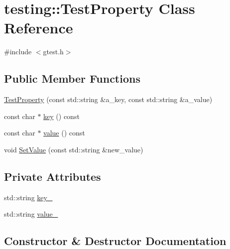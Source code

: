 \hypertarget{classtesting_1_1TestProperty}{}\section{testing\+:\+:Test\+Property Class Reference}
\label{classtesting_1_1TestProperty}


{\ttfamily \#include $<$gtest.\+h$>$}

\subsection*{Public Member Functions}
\begin{DoxyCompactItemize}
\item 
\hyperlink{classtesting_1_1TestProperty_a25a0ccf1c75a92af46a48d3c2a873e6d}{Test\+Property} (const std\+::string \&a\+\_\+key, const std\+::string \&a\+\_\+value)
\item 
const char $\ast$ \hyperlink{classtesting_1_1TestProperty_ad60435d4ad04ac030487d8998fc61c5f}{key} () const
\item 
const char $\ast$ \hyperlink{classtesting_1_1TestProperty_ad423a07af33c88b0c9ed33ee74815a63}{value} () const
\item 
void \hyperlink{classtesting_1_1TestProperty_a377245335d9f614cd06d1650e3358e1d}{Set\+Value} (const std\+::string \&new\+\_\+value)
\end{DoxyCompactItemize}
\subsection*{Private Attributes}
\begin{DoxyCompactItemize}
\item 
std\+::string \hyperlink{classtesting_1_1TestProperty_a948544067d61e790bd37e234186fa708}{key\+\_\+}
\item 
std\+::string \hyperlink{classtesting_1_1TestProperty_a204e3793205a1e61412fc34be1913c01}{value\+\_\+}
\end{DoxyCompactItemize}


\subsection{Constructor \& Destructor Documentation}
\mbox{\label{classtesting_1_1TestProperty_a25a0ccf1c75a92af46a48d3c2a873e6d}} 
